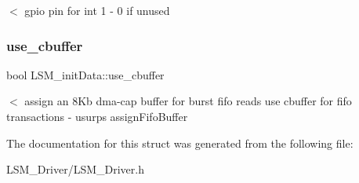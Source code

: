 $<$ gpio pin for int 1 -\/ 0 if unused \mbox{\label{structLSM__initData_a6daa9b9c11602e8b64c4a1f33ab03a2b}} 
\subsubsection{\texorpdfstring{use\+\_\+cbuffer}{use\_cbuffer}}
{\footnotesize\ttfamily bool L\+S\+M\+\_\+init\+Data\+::use\+\_\+cbuffer}

$<$ assign an 8\+Kb dma-\/cap buffer for burst fifo reads use cbuffer for fifo transactions -\/ usurps assign\+Fifo\+Buffer 

The documentation for this struct was generated from the following file\+:\begin{DoxyCompactItemize}
\item 
L\+S\+M\+\_\+\+Driver/L\+S\+M\+\_\+\+Driver.\+h\end{DoxyCompactItemize}
